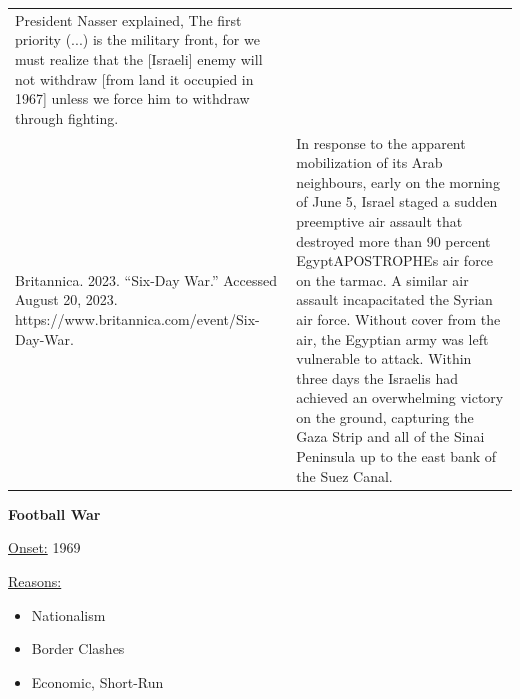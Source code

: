 {\begin{longtable}{p{}p{}}
President Nasser explained, The first priority (...) is the military front, for we must realize that the [Israeli] enemy will not withdraw [from land it occupied in 1967] unless we force him to withdraw through fighting.
\\
Britannica. 2023. “Six-Day War.” Accessed August 20, 2023. https://www.britannica.com/event/Six-Day-War. & In response to the apparent mobilization of its Arab neighbours, early on the morning of June 5, Israel staged a sudden preemptive air assault that destroyed more than 90 percent EgyptAPOSTROPHEs air force on the tarmac. A similar air assault incapacitated the Syrian air force. Without cover from the air, the Egyptian army was left vulnerable to attack. Within three days the Israelis had achieved an overwhelming victory on the ground, capturing the Gaza Strip and all of the Sinai Peninsula up to the east bank of the Suez Canal.


\\
\end{longtable}}
\clearpage
         \textbf{Football War} 

          \underline{Onset:} 1969         

\underline{Reasons:}
\begin{itemize}
\item Nationalism
\item Border Clashes
\item Economic, Short-Run
\end{itemize}

